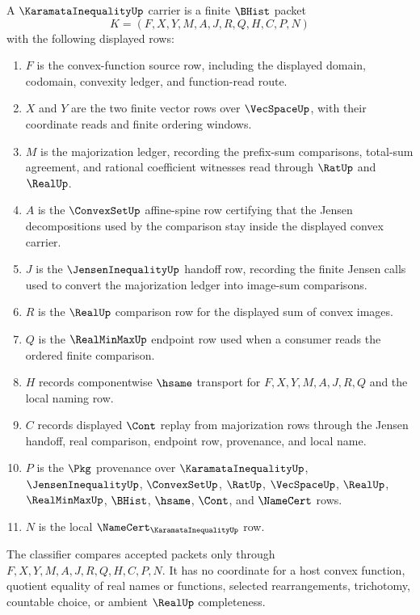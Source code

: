 \begin{definition}
\label{def:karamata-inequality-carrier}
A $\KaramataInequalityUp$ carrier is a finite $\BHist$ packet
$$
K=(F,X,Y,M,A,J,R,Q,H,C,P,N)
$$
with the following displayed rows:
\begin{enumerate}
\item $F$ is the convex-function source row, including the displayed domain, codomain, convexity ledger, and function-read route.
\item $X$ and $Y$ are the two finite vector rows over $\VecSpaceUp$, with their coordinate reads and finite ordering windows.
\item $M$ is the majorization ledger, recording the prefix-sum comparisons, total-sum agreement, and rational coefficient witnesses read through $\RatUp$ and $\RealUp$.
\item $A$ is the $\ConvexSetUp$ affine-spine row certifying that the Jensen decompositions used by the comparison stay inside the displayed convex carrier.
\item $J$ is the $\JensenInequalityUp$ handoff row, recording the finite Jensen calls used to convert the majorization ledger into image-sum comparisons.
\item $R$ is the $\RealUp$ comparison row for the displayed sum of convex images.
\item $Q$ is the $\RealMinMaxUp$ endpoint row used when a consumer reads the ordered finite comparison.
\item $H$ records componentwise $\hsame$ transport for $F,X,Y,M,A,J,R,Q$ and the local naming row.
\item $C$ records displayed $\Cont$ replay from majorization rows through the Jensen handoff, real comparison, endpoint row, provenance, and local name.
\item $P$ is the $\Pkg$ provenance over $\KaramataInequalityUp$, $\JensenInequalityUp$, $\ConvexSetUp$, $\RatUp$, $\VecSpaceUp$, $\RealUp$, $\RealMinMaxUp$, $\BHist$, $\hsame$, $\Cont$, and $\NameCert$ rows.
\item $N$ is the local $\NameCert_{\KaramataInequalityUp}$ row.
\end{enumerate}
The classifier compares accepted packets only through $F,X,Y,M,A,J,R,Q,H,C,P,N$. It has no coordinate for a host convex function, quotient equality of real names or functions, selected rearrangements, trichotomy, countable choice, or ambient $\RealUp$ completeness.
\end{definition}

